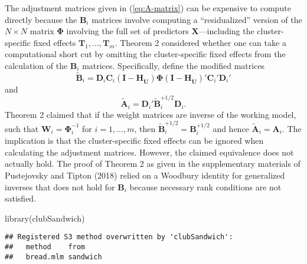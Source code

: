 \documentclass[12pt]{article}
\newenvironment{Shaded}{\begin{snugshade}}{\end{snugshade}}
\newcommand{\FunctionTok}[1]{\textcolor[rgb]{0.00,0.00,0.00}{#1}}
\newcommand{\NormalTok}[1]{#1}
\begin{document}
The adjustment matrices given in (\ref{eq:A-matrix}) can be expensive to
compute directly because the \(\mathbf{B}_i\) matrices involve computing
a ``residualized'' version of the \(N \times N\) matrix
\(\boldsymbol\Phi\) involving the full set of predictors
\(\mathbf{X}\)---including the cluster-specific fixed effects
\(\mathbf{T}_1,...,\mathbf{T}_m\). Theorem 2 considered whether one can
take a computational short cut by omitting the cluster-specific fixed
effects from the calculation of the \(\mathbf{B}_i\) matrices.
Specifically, define the modified matrices \begin{equation}
\label{eq:B-modified}
\mathbf{\tilde{B}}_i = \mathbf{D}_i \mathbf{C}_i \left(\mathbf{I} - \mathbf{H}_{\mathbf{\ddot{U}}}\right) \boldsymbol\Phi \left(\mathbf{I} - \mathbf{H}_{\mathbf{\ddot{U}}}\right)'\mathbf{C}_i' \mathbf{D}_i'
\end{equation} and \begin{equation}
\label{eq:A-modified}
\mathbf{\tilde{A}}_i = \mathbf{D}_i' \mathbf{\tilde{B}}_i^{+1/2} \mathbf{D}_i.
\end{equation} Theorem 2 claimed that if the weight matrices are inverse
of the working model, such that
\(\mathbf{W}_i = \boldsymbol\Phi_i^{-1}\) for \(i = 1,...,m\), then
\(\mathbf{\tilde{B}}_i^{+1/2} = \mathbf{B}_i^{+1/2}\) and hence
\(\mathbf{\tilde{A}}_i = \mathbf{A}_i\). The implication is that the
cluster-specific fixed effects can be ignored when calculating the
adjustment matrices. However, the claimed equivalence does not actually
hold. The proof of Theorem 2 as given in the supplementary materials of
Pustejovsky and Tipton (2018) relied on a Woodbury identity for
generalized inverses that does not hold for \(\mathbf{B}_i\) because
necessary rank conditions are not satisfied.

\begin{Shaded}
\begin{Highlighting}[]
\FunctionTok{library}\NormalTok{(clubSandwich)}
\end{Highlighting}
\end{Shaded}

\begin{verbatim}
## Registered S3 method overwritten by 'clubSandwich':
##   method    from    
##   bread.mlm sandwich
\end{verbatim}
\end{document}
